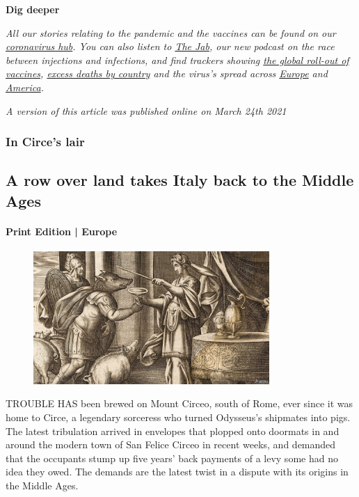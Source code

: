 \documentclass{article}
\begin{document}
\textbf{Dig deeper} 

\emph{All our stories relating to the pandemic and the vaccines can be found on our \href{/news/2020/03/11/the-economists-coverage-of-the-coronavirus}{coronavirus hub}. You can also listen to \href{/podcasts/the-jab-a-new-podcast-from-the-economist}{The Jab}, our new podcast on the race between injections and infections, and find trackers showing \href{https://www.economist.com/graphic-detail/tracking-coronavirus-across-the-world}{the global roll-out of vaccines}, \href{https://www.economist.com/graphic-detail/coronavirus-excess-deaths-tracker}{excess deaths by country} and the virus's spread across \href{https://www.economist.com/graphic-detail/tracking-coronavirus-across-europe}{Europe} and \href{https://www.economist.com/graphic-detail/tracking-coronavirus-across-america}{America}.} 

\emph{A version of this article was published online on March 24th 2021} 
\clearpage
\subsubsection{In Circe's lair }
\subsection{A row over land takes Italy back to the Middle Ages }
\paragraph{Print Edition | Europe  \quad \color{gray}{Mar 27th 2021 }}
\begin{figure}[h]
\centering
\includegraphics[width=0.8\textwidth]{images/20210327_EUP001_0.jpg}
\end{figure}
\lettrine{T}ROUBLE HAS been brewed on Mount Circeo, south of Rome, ever since it was home to Circe, a legendary sorceress who turned Odysseus's shipmates into pigs. The latest tribulation arrived in envelopes that plopped onto doormats in and around the modern town of San Felice Circeo in recent weeks, and demanded that the occupants stump up five years' back payments of a levy some had no idea they owed. The demands are the latest twist in a dispute with its origins in the Middle Ages. 
\end{document}
